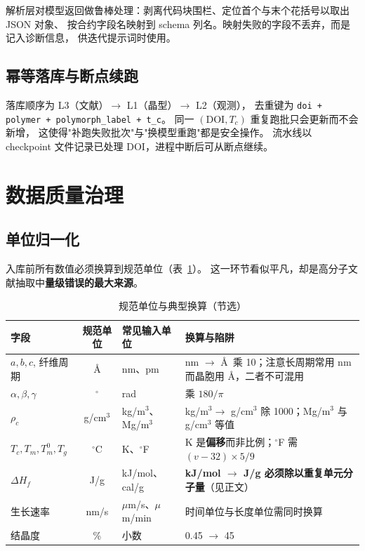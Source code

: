 \documentclass[11pt,a4paper]{ctexart}
\begin{document}
解析层对模型返回做鲁棒处理：剥离代码块围栏、定位首个与末个花括号以取出 JSON 对象、
按合约字段名映射到 schema 列名。映射失败的字段不丢弃，而是记入诊断信息，
供迭代提示词时使用。

\subsection{幂等落库与断点续跑}

落库顺序为 L3（文献）$\rightarrow$ L1（晶型）$\rightarrow$ L2（观测），
去重键为 \texttt{doi + polymer + polymorph\_label + t\_c}。
同一 $(\text{DOI}, T_c)$ 重复跑批只会更新而不会新增，
这使得"补跑失败批次"与"换模型重跑"都是安全操作。
流水线以 checkpoint 文件记录已处理 DOI，进程中断后可从断点继续。

\section{数据质量治理}\label{sec:quality}

\subsection{单位归一化}

入库前所有数值必须换算到规范单位（表~\ref{tab:units}）。
这一环节看似平凡，却是高分子文献抽取中\textbf{量级错误的最大来源}。

\begin{table}[htbp]
\centering
\caption{规范单位与典型换算（节选）}
\label{tab:units}
\begin{tabularx}{\textwidth}{l c l X}
\toprule
字段 & 规范单位 & 常见输入单位 & 换算与陷阱\\
\midrule
$a,b,c$, 纤维周期 & \AA & nm、pm & nm $\to$ \AA\ 乘 10；注意长周期常用 nm 而晶胞用 \AA，二者不可混用\\
$\alpha,\beta,\gamma$ & $^\circ$ & rad & 乘 $180/\pi$\\
$\rho_c$ & g/cm$^3$ & kg/m$^3$、Mg/m$^3$ & kg/m$^3\to$ g/cm$^3$ 除 1000；Mg/m$^3$ 与 g/cm$^3$ 等值\\
$T_c,T_m,T_m^0,T_g$ & $^\circ$C & K、$^\circ$F & K 是\textbf{偏移}而非比例；$^\circ$F 需 $(v-32)\times5/9$\\
$\Delta H_f$ & J/g & kJ/mol、cal/g & \textbf{kJ/mol $\to$ J/g 必须除以重复单元分子量}（见正文）\\
生长速率 & nm/s & $\mu$m/s、$\mu$m/min & 时间单位与长度单位需同时换算\\
结晶度 & \% & 小数 & 0.45 $\to$ 45\\
\bottomrule
\end{tabularx}
\end{table}
\end{document}

